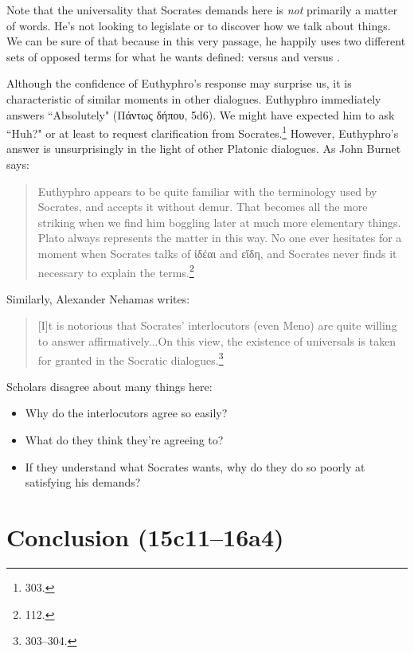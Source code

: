 \documentclass[11pt]{article}
\begin{document}
Note that the universality that Socrates demands here is \emph{not}
primarily a matter of words. He's not looking to legislate or to discover
how we talk about things. We can be sure of that because in this very
passage, he happily uses two different sets of opposed terms for what he
wants defined:  versus  and
 versus .

Although the confidence of Euthyphro's response may surprise us, it is
characteristic of similar moments in other dialogues. Euthyphro immediately
answers ``Absolutely" (Πάντως δήπου, 5d6). We might have expected him to
ask ``Huh?" or at least to request clarification from Socrates.\footnote
{\citet{nehamas1975} 303.}  However, Euthyphro's answer is unsurprisingly
in the light of other Platonic dialogues. As John Burnet says:

\begin{quote}
    Euthyphro appears to be quite familiar with the terminology used by
    Socrates, and accepts it without demur.  That becomes all the more
    striking when we find him boggling later at much more elementary
    things.  Plato always represents the matter in this way.  No one ever
    hesitates for a moment when Socrates talks of ἰδέαι and εἴδη, and
    Socrates never finds it necessary to explain the terms.\footnote
    {\citet{burnet1924} 112.}
\end{quote}

Similarly, Alexander Nehamas writes:

\begin{quote}
    [I]t is notorious that Socrates' interlocutors (even Meno) are quite
    willing to answer affirmatively...On this view, the existence of
    universals is taken for granted in the Socratic dialogues.\footnote
    {\citet{nehamas1975} 303--304.}
\end{quote}

Scholars disagree about many things here:

\begin{itemize}
    \item Why do the interlocutors agree so easily?
    \item What do they think they're agreeing to?
    \item If they understand what Socrates wants, why do they do so poorly
        at satisfying his demands?
\end{itemize}

\section{Conclusion (15c11--16a4)}



\end{document}
